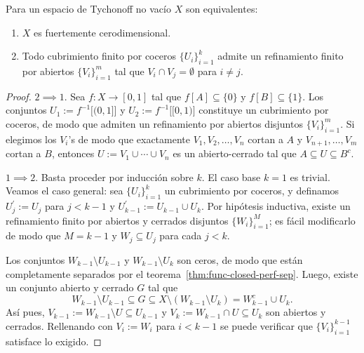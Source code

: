 \documentclass[topologia-analisis.tex]{subfiles}
\begin{document}
\begin{thm}
	Para un espacio de Tychonoff no vacío $X$ son equivalentes:
	\begin{enumerate}
		\item $X$ es fuertemente cerodimensional.
		\item Todo cubrimiento finito por coceros $\{ U_i \}_{i=1}^k$ admite un refinamiento finito por abiertos $\{ V_i \}_{i=1}^m$
			tal que $V_i \cap V_j = \emptyset$ para $i \ne j$.
	\end{enumerate}
\end{thm}
\begin{proof}
	$2 \implies 1$. Sea $f \colon X \to [0, 1]$ tal que $f[A] \subseteq \{ 0 \}$ y $f[B] \subseteq \{ 1 \}$.
	Los conjuntos $U_1 := f^{-1}\big[ (0, 1] \big]$ y $U_2 := f^{-1}\big[ [0, 1) \big]$ constituye un cubrimiento por coceros,
	de modo que admiten un refinamiento por abiertos disjuntos $\{ V_i \}_{i=1}^m$.
	Si elegimos los $V_i$'s de modo que exactamente $V_1, V_2, \dots, V_n$ cortan a $A$ y $V_{n+1}, \dots, V_m$ cortan a $B$,
	entonces $U := V_1 \cup \cdots \cup V_n$ es un abierto-cerrado tal que $A \subseteq U \subseteq B^c$.

	$1 \implies 2$. Basta proceder por inducción sobre $k$.
	El caso base $k = 1$ es trivial.
	Veamos el caso general: sea $\{ U_i \}_{i=1}^k$ un cubrimiento por coceros, y definamos $U_j^\prime := U_j$ para $j < k-1$ y
	$U_{k-1}^\prime := U_{k-1} \cup U_k$.
	Por hipótesis inductiva, existe un refinamiento finito por abiertos y cerrados disjuntos $\{ W_i \}_{i=1}^M$;
	es fácil modificarlo de modo que $M = k-1$ y $W_j \subseteq U_j$ para cada $j < k$.

	Los conjuntos $W_{k-1} \setminus U_{k-1}$ y $W_{k-1} \setminus U_k$ son ceros, de modo que están completamente separados
	por el teorema~\ref{thm:func-closed-perf-sep}.
	Luego, existe un conjunto abierto y cerrado $G$ tal que
	\[
		W_{k-1} \setminus U_{k-1} \subseteq G \subseteq X \setminus (W_{k-1} \setminus U_k) = W_{k-1}^c \cup U_k.
	\]
	Así pues, $V_{k-1} := W_{k-1} \setminus U \subseteq U_{k-1}$ y $V_k := W_{k-1} \cap U \subseteq U_k$ son abiertos y cerrados.
	Rellenando con $V_i := W_i$ para $i < k-1$ se puede verificar que $\{ V_i \}_{i=1}^{k-1}$ satisface lo exigido.
\end{proof}
\end{document}
